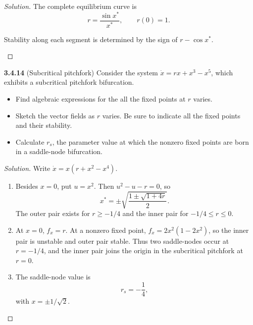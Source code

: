\documentclass[10pt]{amsart}
\newenvironment{solution}
{\begin{proof}[Solution]}
{\end{proof}}
\begin{document}
\begin{onehalfspace}
\begin{solution}
\medskip
The complete equilibrium curve is
\[
r=\frac{\sin x^*}{x^*},\qquad r(0)=1.
\]
\begin{center}

\small Stability along each segment is determined by the sign of $r-\cos x^*$.
\end{center}

\end{solution}

        \noindent\textbf{3.4.14} (Subcritical pitchfork) Consider the system $\dot{x} = rx + x^3 -x^5$, which
        exhibits a subcritical pitchfork bifurcation.
        \begin{itemize}
            \item[a)] Find algebraic expressions for the all the fixed points at $r$ varies.
            \item[b)] Sketch the vector fields as $r$ varies.
            Be sure to indicate all the fixed points and their stability.
            \item[c)] Calculate $r_s$, the parameter value at which the nonzero fixed points are born in a saddle-node
            bifurcation.
        \end{itemize}

        \begin{solution}
Write $\dot x=x(r+x^2-x^4)$.
\begin{enumerate}[label=(\alph*)]
\item Besides $x=0$, put $u=x^2$. Then $u^2-u-r=0$, so
\[x^*=\pm\sqrt{\frac{1\pm\sqrt{1+4r}}{2}}.\]
The outer pair exists for $r\ge-1/4$ and the inner pair for $-1/4\le r\le0$.
\item At $x=0$, $f_x=r$. At a nonzero fixed point, $f_x=2x^2(1-2x^2)$, so the inner pair is unstable and outer pair stable. Thus two saddle-nodes occur at $r=-1/4$, and the inner pair joins the origin in the subcritical pitchfork at $r=0$.
\item The saddle-node value is
\[r_s=-\frac14,\]
with $x=\pm1/\sqrt2$.
\end{enumerate}


\end{solution}
\end{onehalfspace}
\end{document}
